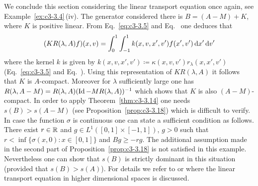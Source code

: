 We conclude this section considering the linear transport equation%
once again, see Example~\ref{ex:c3-3.4}\,(iv).
The generator considered there is $B = (A - M) + K$, where $K$ is positive linear. 
From Eq.~\eqref{eq:c3-3.5} and Eq.~ one deduces that 
\[
(KR(\lambda,A)f)(x,v) = \int_{0}^{1}\int_{-1}^{1} k(x,v,x',v')f(x',v')\mathop{}\!\mathrm{d}{x}'\mathop{}\!\mathrm{d}{v'}
\]
where the kernel $k$ is given by $k(x,v,x',v') \coloneq  \kappa(x,v,v')r_{\lambda}(x,x',v')$ (\cf Eq.~\eqref{eq:c3-3.5} and Eq.~). 
Using this representation of\/ $KR(\lambda,A)$ it follows that $K$ is $A$-compact. 
Moreover for $\lambda$ sufficiently large one has $R(\lambda,A-M) = R(\lambda,A)(\operatorname{Id} - MR(\lambda,A))^{-1}$ which shows that $K$ is also $(A-M)$-compact. 
In order to apply Theorem~\ref{thm:c3-3.14} one needs $s(B) > s(A-M)$ (see Proposition~\ref{prop:c3-3.18}) which is difficult to verify. 
In case the function $\sigma$ is continuous one can state a sufficient condition as follows.
There exist $r \in \mathbb{R} $ and $g \in L^{1}([0,1]\times[-1,1])$, $g > 0$ such that $r < \inf\{\sigma(x,0) \colon x \in [0,1]\}$ and $Bg \geq -rg$.
The additional assumption made in the second part of Proposition~\ref{prop:c3-3.18} is not satisfied in this example. 
Nevertheless one can show that $s(B)$ is strictly dominant in this situation (provided that $s(B) > s(A)$). 
For details we refer to \textcite{greiner:1984d}  or \textcite{voigt:1984b} where the linear transport equation in higher dimensional spaces is discussed.
